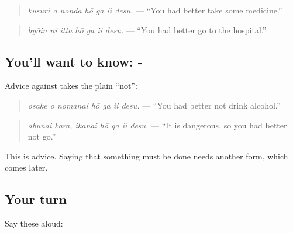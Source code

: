 \begin{quote}
\textbf{   }
\end{quote}

\begin{quote}
\emph{kusuri o nonda hō ga ii desu.} — \textquotedblleft{}You had better take some medicine.\textquotedblright{}
\end{quote}

\begin{quote}
\textbf{   }
\end{quote}

\begin{quote}
\emph{byōin ni itta hō ga ii desu.} — \textquotedblleft{}You had better go to the hospital.\textquotedblright{}
\end{quote}

\subsection*{You'll want to know: -  }
Advice against takes the plain \textquotedblleft{}not\textquotedblright{}:

\begin{quote}
\textbf{   }
\end{quote}

\begin{quote}
\emph{osake o nomanai hō ga ii desu.} — \textquotedblleft{}You had better not drink alcohol.\textquotedblright{}
\end{quote}

\begin{quote}
\textbf{  }
\end{quote}

\begin{quote}
\emph{abunai kara, ikanai hō ga ii desu.} — \textquotedblleft{}It is dangerous, so you had better not go.\textquotedblright{}
\end{quote}

This is advice. Saying that something must be done needs another form, which comes later.

\subsection*{Your turn}
Say these aloud:

